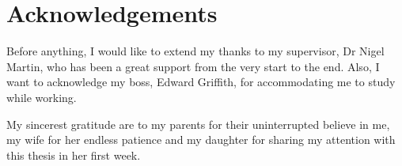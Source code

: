 \chapter*{Acknowledgements}

Before anything, I would like to extend my thanks to my supervisor, Dr Nigel Martin, who has been a great support from the very start to the end. Also, I want to acknowledge my boss, Edward Griffith, for accommodating me to study while working.

My sincerest gratitude are to my parents for their uninterrupted believe in me, my wife for her endless patience and my daughter for sharing my attention with this thesis in her first week.